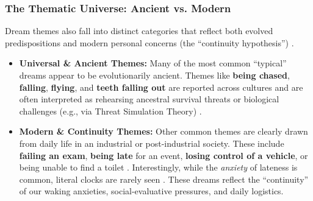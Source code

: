 \subsubsection{The Thematic Universe: Ancient vs. Modern}
Dream themes also fall into distinct categories that reflect both evolved predispositions and modern personal concerns (the ``continuity hypothesis'') \citep{schredl2010continuity}.
\begin{itemize}
    \item \textbf{Universal \& Ancient Themes:} Many of the most common ``typical'' dreams appear to be evolutionarily ancient. Themes like \textbf{being chased}, \textbf{falling}, \textbf{flying}, and \textbf{teeth falling out} are reported across cultures and are often interpreted as rehearsing ancestral survival threats or biological challenges (e.g., via Threat Simulation Theory) \citep{revonsuo2000threat}.
    \item \textbf{Modern \& Continuity Themes:} Other common themes are clearly drawn from daily life in an industrial or post-industrial society. These include \textbf{failing an exam}, \textbf{being late} for an event, \textbf{losing control of a vehicle}, or being unable to find a toilet \citep{nielsen2003typical, schredl2010continuity}. Interestingly, while the \textit{anxiety} of lateness is common, literal clocks are rarely seen \citep{schredl2021clocks}. These dreams reflect the ``continuity'' of our waking anxieties, social-evaluative pressures, and daily logistics.
\end{itemize}